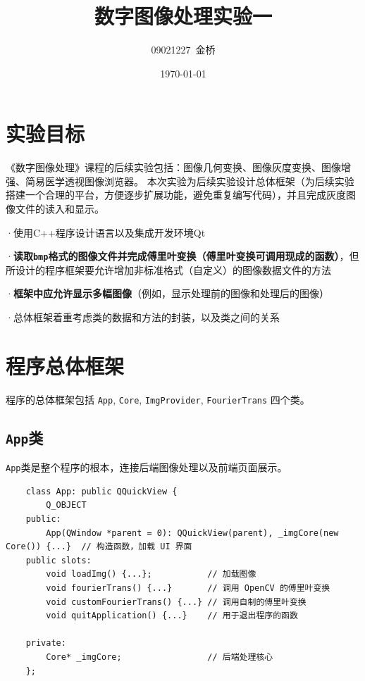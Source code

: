 \documentclass{article}
\title{数字图像处理实验一}
\author{09021227~金桥}
\date{\today}
\begin{document}
\maketitle

\section{实验目标}

《数字图像处理》课程的后续实验包括：图像几何变换、图像灰度变换、图像增强、简易医学透视图像浏览器。
本次实验为后续实验设计总体框架（为后续实验搭建一个合理的平台，方便逐步扩展功能，避免重复编写代码），并且完成灰度图像文件的读入和显示。

·使用C++程序设计语言以及集成开发环境Qt

·\textbf{读取\texttt{bmp}格式的图像文件并完成傅里叶变换（傅里叶变换可调用现成的函数）}，但所设计的程序框架要允许增加非标准格式（自定义）的图像数据文件的方法

·\textbf{框架中应允许显示多幅图像}（例如，显示处理前的图像和处理后的图像）

·总体框架着重考虑类的数据和方法的封装，以及类之间的关系

\section{程序总体框架}

程序的总体框架包括 \texttt{App}, \texttt{Core}, \texttt{ImgProvider}, \texttt{FourierTrans} 四个类。

\subsection{\texttt{App}类}

\texttt{App}类是整个程序的根本，连接后端图像处理以及前端页面展示。

\begin{lstlisting}
    class App: public QQuickView {
        Q_OBJECT
    public:
        App(QWindow *parent = 0): QQuickView(parent), _imgCore(new Core()) {...}  // 构造函数，加载 UI 界面
    public slots:
        void loadImg() {...};           // 加载图像
        void fourierTrans() {...}       // 调用 OpenCV 的傅里叶变换
        void customFourierTrans() {...} // 调用自制的傅里叶变换
        void quitApplication() {...}    // 用于退出程序的函数

    private:
        Core* _imgCore;                 // 后端处理核心
    };
\end{lstlisting}
\end{document}
